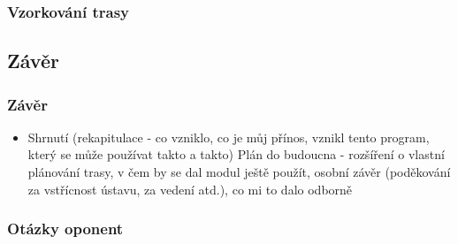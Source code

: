 \documentclass{beamer}
\begin{document}
\begin{frame}
\frametitle{Vzorkování trasy}
\end{frame}

\begin{frame}
\section{Závěr}
\frametitle{Závěr}
\begin{itemize}
	\item Shrnutí (rekapitulace - co vzniklo, co je můj přínos, vznikl tento program, který se může používat takto a takto) Plán do budoucna - rozšíření o vlastní plánování trasy, v čem by se dal modul ještě použít, osobní závěr (poděkování za vstřícnost ústavu, za vedení atd.), co mi to dalo odborně 
\end{itemize}
\end{frame}

\begin{frame}
\frametitle{Otázky oponent}
\end{frame}
\end{document}
